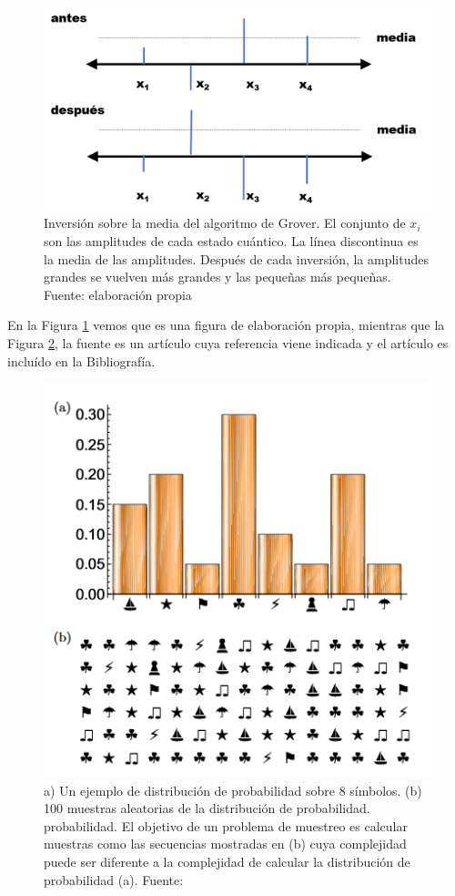 \documentclass[11pt,a4paper,spanish]{book}
\begin{document}
\begin{figure}[h]
	\centerline{\includegraphics[scale=0.4]{figuras/inversionmedia.png}}
	\caption[Inversión sobre la media del algoritmo de Grover]{Inversión sobre la media del algoritmo de Grover. El conjunto de ${x_i}$ son las amplitudes de cada estado cuántico. La línea discontinua es la media de las amplitudes. Después de cada inversión, la amplitudes grandes se vuelven más grandes y las pequeñas más pequeñas. Fuente: elaboración propia}
	\label{fig:inversionmedia}
\end{figure}

En la Figura \ref{fig:inversionmedia} vemos que es una figura de elaboración propia, mientras que la Figura \ref{fig:distprob}, la fuente es un artículo cuya referencia viene indicada y el artículo es incluído en la Bibliografía.

\begin{figure}[h]
	\centerline{\includegraphics[scale=0.6]{figuras/distribucionprobabilidades.png}}
	\caption[Distribución de probabilidades]{a) Un ejemplo de distribución de probabilidad sobre 8 símbolos. (b) 100 muestras aleatorias de la distribución de probabilidad.
		probabilidad. El objetivo de un problema de muestreo es calcular muestras como las secuencias mostradas en (b) cuya complejidad	puede ser diferente a la complejidad de calcular la distribución de probabilidad (a). Fuente: \cite{lund2017}}
	\label{fig:distprob}
\end{figure}
\end{document}
